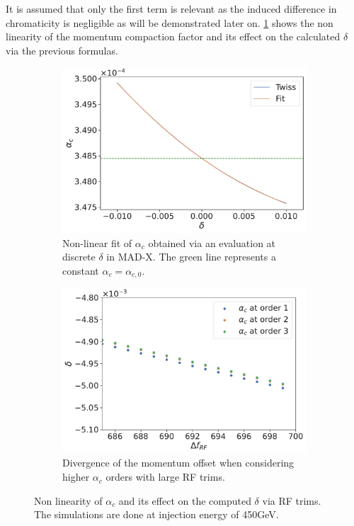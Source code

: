 It is assumed that only the first term is relevant as the induced difference in chromaticity is
negligible as will be demonstrated later on.
\cref{fig:decapoles:chromaticity:momentum_compaction_factor} shows the non linearity of the momentum
compaction factor and its effect on the calculated $\delta$ via the previous formulas.

\begin{figure}[tbh]
    \centering
    \begin{subfigure}[t]{0.48\textwidth}
        \centering
        \includegraphics[width=\textwidth]{images/higher_order_momentum_compaction_factor.pdf}
        \caption{Non-linear fit of $\alpha_c$ obtained via an evaluation at discrete $\delta$ in
        MAD-X. The green line represents a constant $\alpha_c = \alpha_{c,0}$.}
    \end{subfigure}
    \hfill
    \begin{subfigure}[t]{0.48\textwidth}
        \centering
        \includegraphics[width=\textwidth]{images/delta_vs_frf_alpha_c.pdf}
        \caption{Divergence of the momentum offset when considering higher $\alpha_c$ orders with
        large RF trims.}
    \end{subfigure}
    \caption{Non linearity of $\alpha_c$ and its effect on the computed $\delta$ via RF trims. The
    simulations are done at injection energy of 450GeV.}
    \label{fig:decapoles:chromaticity:momentum_compaction_factor}
\end{figure}

